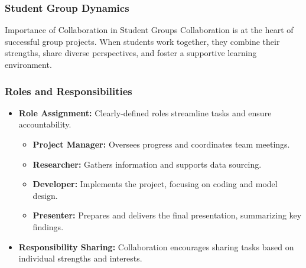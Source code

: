\documentclass[aspectratio=169]{beamer}
\begin{document}
\begin{frame}[fragile]
    \frametitle{Student Group Dynamics}
    \begin{block}{Importance of Collaboration in Student Groups}
        Collaboration is at the heart of successful group projects. When students work together, they combine their strengths, share diverse perspectives, and foster a supportive learning environment.
    \end{block}
\end{frame}

\begin{frame}[fragile]
    \frametitle{Roles and Responsibilities}
    \begin{itemize}
        \item \textbf{Role Assignment:} Clearly-defined roles streamline tasks and ensure accountability.
        \begin{itemize}
            \item \textbf{Project Manager:} Oversees progress and coordinates team meetings.
            \item \textbf{Researcher:} Gathers information and supports data sourcing.
            \item \textbf{Developer:} Implements the project, focusing on coding and model design.
            \item \textbf{Presenter:} Prepares and delivers the final presentation, summarizing key findings.
        \end{itemize}
        \item \textbf{Responsibility Sharing:} Collaboration encourages sharing tasks based on individual strengths and interests.
    \end{itemize}
\end{frame}
\end{document}
